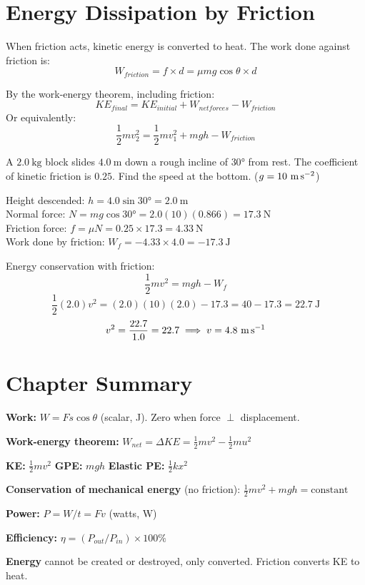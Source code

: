\section{Energy Dissipation by Friction}

When friction acts, kinetic energy is converted to heat.
The work done against friction is:
\[
  W_{friction} = f \times d = \mu mg\cos\theta \times d
\]

By the work-energy theorem, including friction:
\[
  KE_{final} = KE_{initial} + W_{net forces}
  - W_{friction}
\]
Or equivalently:
\[
  \frac{1}{2}mv_2^2 = \frac{1}{2}mv_1^2
  + mgh - W_{friction}
\]

\begin{examplebox}[5.7]
A $2.0\ \text{kg}$ block slides $4.0\ \text{m}$ down
a rough incline of $30°$ from rest. The coefficient
of kinetic friction is $0.25$. Find the speed at the
bottom. ($g = 10\ \text{m\,s}^{-2}$)
\end{examplebox}

\begin{solutionbox}
Height descended: $h = 4.0\sin 30° = 2.0\ \text{m}$\\
Normal force: $N = mg\cos 30° = 2.0(10)(0.866) = 17.3\ \text{N}$\\
Friction force: $f = \mu N = 0.25 \times 17.3 = 4.33\ \text{N}$\\
Work done by friction: $W_f = -4.33 \times 4.0 = -17.3\ \text{J}$

Energy conservation with friction:
\[
  \frac{1}{2}mv^2 = mgh - W_f
\]
\[
  \frac{1}{2}(2.0)v^2 = (2.0)(10)(2.0) - 17.3
  = 40 - 17.3 = 22.7\ \text{J}
\]
\[
  v^2 = \frac{22.7}{1.0} = 22.7
  \implies v = 4.8\ \text{m\,s}^{-1}
\]
\end{solutionbox}

\section{Chapter Summary}

\begin{summarybox}
\textbf{Work:} $W = Fs\cos\theta$ (scalar, J).
Zero when force $\perp$ displacement.

\textbf{Work-energy theorem:}
$W_{net} = \Delta KE = \frac{1}{2}mv^2 - \frac{1}{2}mu^2$

\textbf{KE:} $\frac{1}{2}mv^2$ \quad
\textbf{GPE:} $mgh$ \quad
\textbf{Elastic PE:} $\frac{1}{2}kx^2$

\textbf{Conservation of mechanical energy}
(no friction):
$\frac{1}{2}mv^2 + mgh = \text{constant}$

\textbf{Power:}
$P = W/t = Fv$ (watts, W)

\textbf{Efficiency:}
$\eta = (P_{out}/P_{in}) \times 100\%$

\textbf{Energy} cannot be created or destroyed,
only converted. Friction converts KE to heat.
\end{summarybox}

